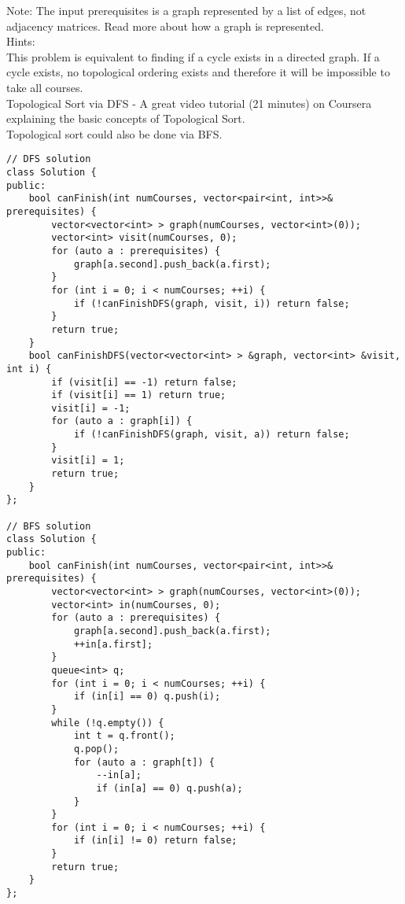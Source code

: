 Note:
The input prerequisites is a graph represented by a list of edges, not adjacency matrices. Read more about how a graph is represented.\\

Hints:\\
    This problem is equivalent to finding if a cycle exists in a directed graph. If a cycle exists, no topological ordering exists and therefore it will be impossible to take all courses.\\
    Topological Sort via DFS - A great video tutorial (21 minutes) on Coursera explaining the basic concepts of Topological Sort.\\
    Topological sort could also be done via BFS.\\

\begin{lstlisting}
// DFS solution
class Solution {
public:
    bool canFinish(int numCourses, vector<pair<int, int>>& prerequisites) {
        vector<vector<int> > graph(numCourses, vector<int>(0));
        vector<int> visit(numCourses, 0);
        for (auto a : prerequisites) {
            graph[a.second].push_back(a.first);
        }
        for (int i = 0; i < numCourses; ++i) {
            if (!canFinishDFS(graph, visit, i)) return false;
        }
        return true;
    }
    bool canFinishDFS(vector<vector<int> > &graph, vector<int> &visit, int i) {
        if (visit[i] == -1) return false;
        if (visit[i] == 1) return true;
        visit[i] = -1;
        for (auto a : graph[i]) {
            if (!canFinishDFS(graph, visit, a)) return false;
        }
        visit[i] = 1;
        return true;
    }
};

// BFS solution
class Solution {
public:
    bool canFinish(int numCourses, vector<pair<int, int>>& prerequisites) {
        vector<vector<int> > graph(numCourses, vector<int>(0));
        vector<int> in(numCourses, 0);
        for (auto a : prerequisites) {
            graph[a.second].push_back(a.first);
            ++in[a.first];
        }
        queue<int> q;
        for (int i = 0; i < numCourses; ++i) {
            if (in[i] == 0) q.push(i);
        }
        while (!q.empty()) {
            int t = q.front();
            q.pop();
            for (auto a : graph[t]) {
                --in[a];
                if (in[a] == 0) q.push(a);
            }
        }
        for (int i = 0; i < numCourses; ++i) {
            if (in[i] != 0) return false;
        }
        return true;
    }
};
\end{lstlisting}

